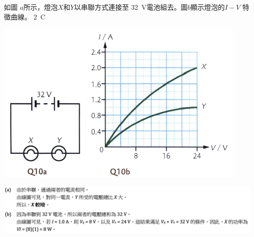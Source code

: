 {
    如圖 $a$所示，燈泡$X$和$Y$以串聯方式連接至 \qty{32}{V}電池組去。圖$b$顯示燈泡的$I-V$ 特徵曲線。
    \qty{2}{C}
    \par{\par\centering\includegraphics[width=.5\textwidth]{./img/ch2_circuit_lq_2024-06-14-14-21-43.png}\par}
}{
    \par{\par\centering\includegraphics[width=\textwidth]{./img/ch2_circuit_lq_2024-06-16-12-14-51.png}\par}

}

